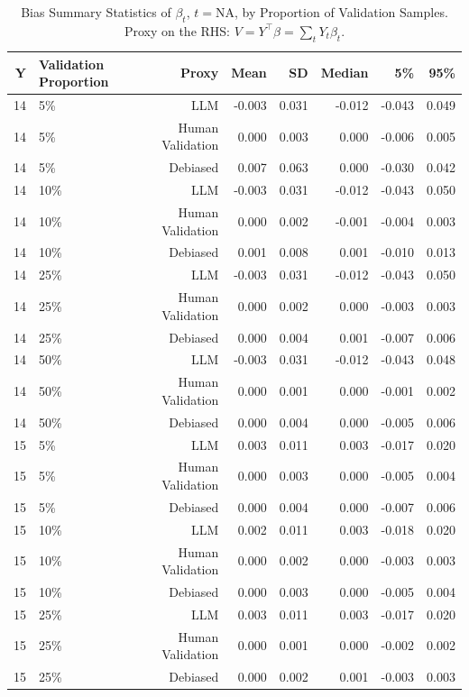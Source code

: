 \begin{table}

\caption{Bias Summary Statistics of $\beta_{t}$, $t=$NA, by Proportion of Validation Samples.
      Proxy on the RHS: $V = Y^\top \beta = \sum_{t} Y_t \beta_t$.}
\centering
\begin{tabular}[t]{rlrrrrrr}
\toprule
Y & Validation Proportion & Proxy & Mean & SD & Median & 5\% & 95\%\\
\midrule
14 & 5\% & LLM & -0.003 & 0.031 & -0.012 & -0.043 & 0.049\\
14 & 5\% & Human Validation & 0.000 & 0.003 & 0.000 & -0.006 & 0.005\\
14 & 5\% & Debiased & 0.007 & 0.063 & 0.000 & -0.030 & 0.042\\
14 & 10\% & LLM & -0.003 & 0.031 & -0.012 & -0.043 & 0.050\\
14 & 10\% & Human Validation & 0.000 & 0.002 & -0.001 & -0.004 & 0.003\\
14 & 10\% & Debiased & 0.001 & 0.008 & 0.001 & -0.010 & 0.013\\
14 & 25\% & LLM & -0.003 & 0.031 & -0.012 & -0.043 & 0.050\\
14 & 25\% & Human Validation & 0.000 & 0.002 & 0.000 & -0.003 & 0.003\\
14 & 25\% & Debiased & 0.000 & 0.004 & 0.001 & -0.007 & 0.006\\
14 & 50\% & LLM & -0.003 & 0.031 & -0.012 & -0.043 & 0.048\\
14 & 50\% & Human Validation & 0.000 & 0.001 & 0.000 & -0.001 & 0.002\\
14 & 50\% & Debiased & 0.000 & 0.004 & 0.000 & -0.005 & 0.006\\
15 & 5\% & LLM & 0.003 & 0.011 & 0.003 & -0.017 & 0.020\\
15 & 5\% & Human Validation & 0.000 & 0.003 & 0.000 & -0.005 & 0.004\\
15 & 5\% & Debiased & 0.000 & 0.004 & 0.000 & -0.007 & 0.006\\
15 & 10\% & LLM & 0.002 & 0.011 & 0.003 & -0.018 & 0.020\\
15 & 10\% & Human Validation & 0.000 & 0.002 & 0.000 & -0.003 & 0.003\\
15 & 10\% & Debiased & 0.000 & 0.003 & 0.000 & -0.005 & 0.004\\
15 & 25\% & LLM & 0.003 & 0.011 & 0.003 & -0.017 & 0.020\\
15 & 25\% & Human Validation & 0.000 & 0.001 & 0.000 & -0.002 & 0.002\\
15 & 25\% & Debiased & 0.000 & 0.002 & 0.001 & -0.003 & 0.003\\

\end{tabular}
\end{table}
